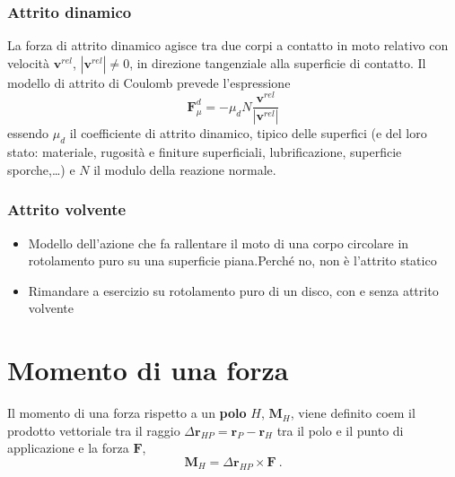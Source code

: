 \subsubsection{Attrito dinamico}
La forza di attrito dinamico agisce tra due corpi a contatto in moto relativo con velocità $\mathbf{v}^{rel}$, $|\mathbf{v}^{rel}| \ne 0$, in direzione tangenziale alla superficie di contatto. Il modello di attrito di Coulomb prevede l'espressione
\begin{equation}
    \mathbf{F}^d_{\mu} = - \mu_d N \dfrac{\mathbf{v}^{rel}}{|\mathbf{v}^{rel}|}
\end{equation}
essendo $\mu_d$ il coefficiente di attrito dinamico, tipico delle superfici (e del loro stato: materiale, rugosità e finiture superficiali, lubrificazione, superficie sporche,\dots) e $N$ il modulo della reazione normale.

\subsubsection{Attrito volvente}
{\color{red}
\begin{itemize}
    \item Modello dell'azione che fa rallentare il moto di una corpo circolare in rotolamento puro su una superficie piana.Perché no, non è l'attrito statico
    \item Rimandare a esercizio su rotolamento puro di un disco, con e senza attrito volvente
\end{itemize}
}

\section{Momento di una forza}
\begin{definition} Il momento di una forza rispetto a un \textbf{polo} $H$, $\mathbf{M}_H$, viene definito coem il prodotto vettoriale tra il raggio $\Delta \mathbf{r}_{HP} = \mathbf{r}_P - \mathbf{r}_H$ tra il polo e il punto di applicazione e la forza $\mathbf{F}$,
    \begin{equation} \mathbf{M}_H = \Delta \mathbf{r}_{HP} \times \mathbf{F} \ .
    \end{equation}
\end{definition}

